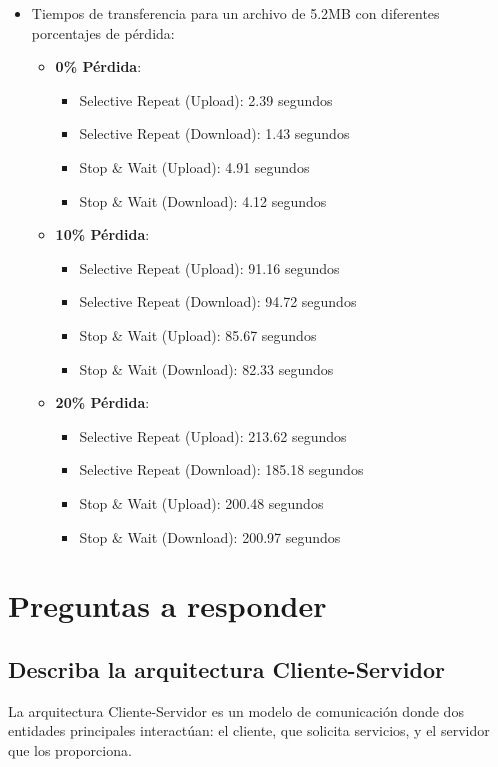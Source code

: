 \documentclass[a4paper,10pt]{article}
\begin{document}
\begin{itemize}
    \item Tiempos de transferencia para un archivo de 5.2MB con diferentes porcentajes de pérdida:
    \begin{itemize}
        \item \textbf{0\% Pérdida}:
        \begin{itemize}
            \item Selective Repeat (Upload): 2.39 segundos
            \item Selective Repeat (Download): 1.43 segundos
            \item Stop \& Wait (Upload): 4.91 segundos
            \item Stop \& Wait (Download): 4.12 segundos
        \end{itemize}
        \item \textbf{10\% Pérdida}:
        \begin{itemize}
            \item Selective Repeat (Upload): 91.16 segundos
            \item Selective Repeat (Download): 94.72 segundos
            \item Stop \& Wait (Upload): 85.67 segundos
            \item Stop \& Wait (Download): 82.33 segundos
        \end{itemize}
        \item \textbf{20\% Pérdida}:
        \begin{itemize}
            \item Selective Repeat (Upload): 213.62 segundos
            \item Selective Repeat (Download): 185.18 segundos
            \item Stop \& Wait (Upload): 200.48 segundos
            \item Stop \& Wait (Download): 200.97 segundos
        \end{itemize}
    \end{itemize}
\end{itemize}

\section{Preguntas a responder}
\subsection{Describa la arquitectura Cliente-Servidor}
La arquitectura Cliente-Servidor es un modelo de comunicación donde dos entidades principales interactúan: el cliente, que solicita servicios, y el servidor que los proporciona.
\end{document}
